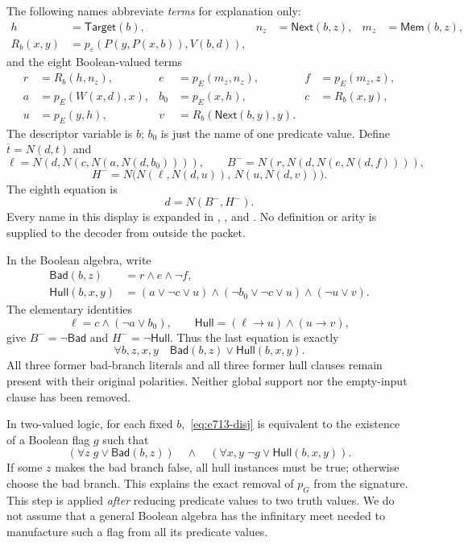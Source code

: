 The following names abbreviate \emph{terms} for explanation only:
\begin{align*}
 h&=\mathsf{Target}(b),& n_z&=\mathsf{Next}(b,z),&m_z&=\mathsf{Mem}(b,z),\\
 R_b(x,y)&=p_\varepsilon(P(y,P(x,b)),V(b,d)),&&&
\end{align*}
and the eight Boolean-valued terms
\begin{align*}
 r&=R_b(h,n_z),&e&=p_E(m_z,n_z),&f&=p_E(m_z,z),\\
 a&=p_E(W(x,d),x),&b_0&=p_E(x,h),&c&=R_b(x,y),\\
 u&=p_E(y,h),&v&=R_b(\mathsf{Next}(b,y),y).&&
\end{align*}
The descriptor variable is $b$; $b_0$ is just the name of one predicate
value. Define $\overline t=N(d,t)$ and
\[
 \ell=N(d,N(c,N(a,N(d,b_0)))),\qquad
 B^-=N(r,N(d,N(e,N(d,f)))),
\]
\[
 H^-=N\bigl(N(\ell,N(d,u)),\,N(u,N(d,v))\bigr).
\]
The eighth equation is
\begin{equation}
                       d=N(B^-,H^-).\label{eq:e713-closure}
\end{equation}
Every name in this display is expanded in
, , and
. No definition or arity is supplied to the
decoder from outside the packet.

In the Boolean algebra, write
\begin{align*}
 \mathsf{Bad}(b,z)&=r\land e\land\neg f,\\
 \mathsf{Hull}(b,x,y)&=(a\lor\neg c\lor u)
       \land(\neg b_0\lor\neg c\lor u)
       \land(\neg u\lor v).
\end{align*}
The elementary identities
\[
 \ell=c\land(\neg a\lor b_0),\qquad
 \mathsf{Hull}=(\ell\to u)\land(u\to v),
\]
give $B^-=\neg\mathsf{Bad}$ and $H^-=\neg\mathsf{Hull}$. Thus the
last equation is exactly
\begin{equation}
 \forall b,z,x,y\quad
       \mathsf{Bad}(b,z)\lor\mathsf{Hull}(b,x,y).\label{eq:e713-disj}
\end{equation}
All three former bad-branch literals and all three former hull clauses
remain present with their original polarities. Neither global support nor
the empty-input clause has been removed.

In two-valued logic, for each fixed $b$,~\eqref{eq:e713-disj} is equivalent
to the existence of a Boolean flag $g$ such that
\[
  (\forall z\;g\lor\mathsf{Bad}(b,z))
  \quad\land\quad
  (\forall x,y\;\neg g\lor\mathsf{Hull}(b,x,y)).
\]
If some $z$ makes the bad branch false, all hull instances must be true;
otherwise choose the bad branch. This explains the exact removal of
$p_G$ from the signature. This step is applied \emph{after} reducing
predicate values to two truth values. We do not assume that a general
Boolean algebra has the infinitary meet needed to manufacture such a
flag from all its predicate values.

